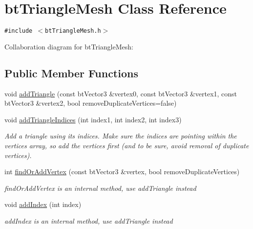 \hypertarget{classbt_triangle_mesh}{
\section{btTriangleMesh Class Reference}
\label{classbt_triangle_mesh}
}
{\tt \#include $<$btTriangleMesh.h$>$}

Collaboration diagram for btTriangleMesh:\subsection*{Public Member Functions}
\begin{CompactItemize}
\item 
void \hyperlink{classbt_triangle_mesh_28551d57ae59248a210163a504558583}{addTriangle} (const btVector3 \&vertex0, const btVector3 \&vertex1, const btVector3 \&vertex2, bool removeDuplicateVertices=false)
\item 
\hypertarget{classbt_triangle_mesh_3ec1774f0f06d5f5bcf815845589796b}{
void \hyperlink{classbt_triangle_mesh_3ec1774f0f06d5f5bcf815845589796b}{addTriangleIndices} (int index1, int index2, int index3)}
\label{classbt_triangle_mesh_3ec1774f0f06d5f5bcf815845589796b}

\begin{CompactList}\small\item\em Add a triangle using its indices. Make sure the indices are pointing within the vertices array, so add the vertices first (and to be sure, avoid removal of duplicate vertices). \item\end{CompactList}\item 
int \hyperlink{classbt_triangle_mesh_3b521a1faa5862a818d9f983230749a2}{findOrAddVertex} (const btVector3 \&vertex, bool removeDuplicateVertices)
\begin{CompactList}\small\item\em findOrAddVertex is an internal method, use addTriangle instead \item\end{CompactList}\item 
\hypertarget{classbt_triangle_mesh_ceefc2d4c6a9abaff3bd58310533fd8a}{
void \hyperlink{classbt_triangle_mesh_ceefc2d4c6a9abaff3bd58310533fd8a}{addIndex} (int index)}
\label{classbt_triangle_mesh_ceefc2d4c6a9abaff3bd58310533fd8a}

\begin{CompactList}\small\item\em addIndex is an internal method, use addTriangle instead \item\end{CompactList}\end{CompactItemize}



